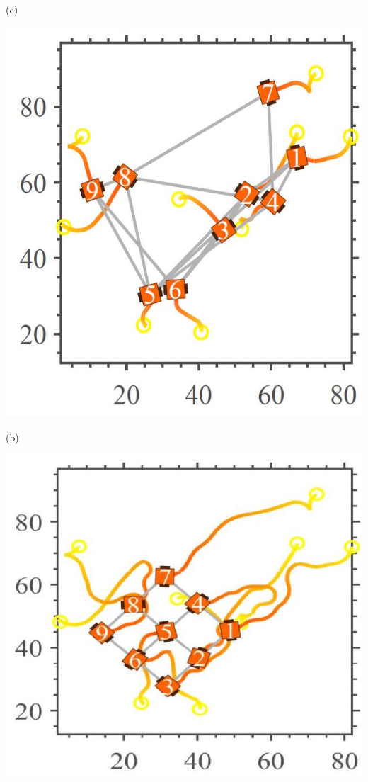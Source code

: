 \documentclass[10pt]{article}
\begin{document}
(c)

\begin{center}
\includegraphics[max width=\textwidth]{2023_10_07_53b70c7408bc8e139415g-51(3)}
\end{center}

(b)

\begin{center}
\includegraphics[max width=\textwidth]{2023_10_07_53b70c7408bc8e139415g-51(2)}
\end{center}
\end{document}
